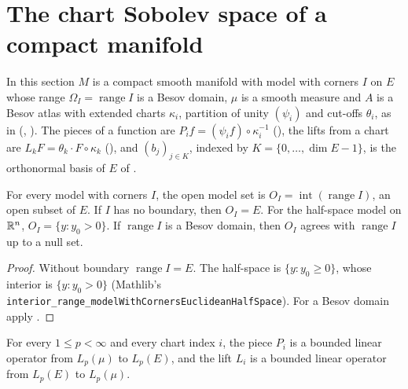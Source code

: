 \section{The chart Sobolev space of a compact manifold}
\label{sec:chart-sobolev}

In this section $M$ is a compact smooth manifold with model with corners $I$ on $E$ whose range
$\Omega_I = \operatorname{range} I$ is a Besov domain, $\mu$ is a smooth measure and $A$ is a Besov
atlas with extended charts $\kappa_i$, partition of unity $(\psi_i)$ and cut-offs $\theta_i$, as in
 (, ). The pieces of a function
are $P_i f = (\psi_i f) \circ \kappa_i^{-1}$ (), the lifts from a chart are
$L_k F = \theta_k \cdot F \circ \kappa_k$ (), and $(b_j)_{j \in K}$, indexed
by $K = \{0, \dots, \dim E - 1\}$, is the orthonormal basis of $E$ of .

\begin{definition}
\label{def:model-interior}
\leanok
{}
For every model with corners $I$, the open model set is $O_I = \operatorname{int}
(\operatorname{range} I)$, an open subset of $E$. If $I$ has no boundary, then $O_I = E$. For the
half-space model on $\mathbb{R}^n$, $O_I = \{y : y_0 > 0\}$. If $\operatorname{range} I$ is a Besov
domain, then $O_I$ agrees with $\operatorname{range} I$ up to a null set.
\end{definition}

\begin{proof}
\leanok
Without boundary $\operatorname{range} I = E$. The half-space is $\{y : y_0 \geq 0\}$, whose
interior is $\{y : y_0 > 0\}$ (Mathlib's
\texttt{interior\_\allowbreak range\_\allowbreak modelWithCornersEuclideanHalfSpace}). For a Besov
domain apply .
\end{proof}

\begin{lemma}
\label{lem:chart-lift-operator}
\leanok
{}
For every $1 \leq p < \infty$ and every chart index $i$, the piece $P_i$ is a bounded linear
operator from $L_p(\mu)$ to $L_p(E)$, and the lift $L_i$ is a bounded linear operator from
$L_p(E)$ to $L_p(\mu)$.
\end{lemma}

